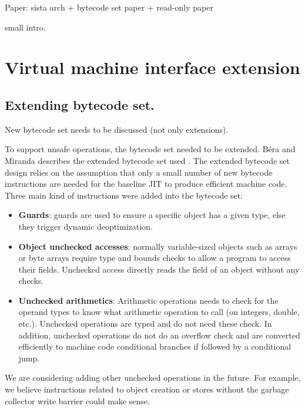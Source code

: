 \documentclass[a4paper,12pt,twoside]{../includes/ThesisStyle}
\begin{document}

Paper: sista arch + bytecode set paper + read-only paper

small intro. 

\section{Virtual machine interface extension}

\subsection{Extending bytecode set.}

New bytecode set needs to be discussed (not only extensions).

To support unsafe operations, the bytecode set needed to be extended. B\'era and Miranda describes the extended bytecode set used \cite{Bera14a}. The extended bytecode set design relies on the assumption that only a small number of new bytecode instructions are needed for the baseline JIT to produce efficient machine code. Three main kind of instructions were added into the bytecode set:
\begin{itemize}
\item \textbf{Guards}: guards are used to ensure a specific object has a given type, else they trigger dynamic deoptimization.
\item \textbf{Object unchecked accesses}: normally variable-sized objects such as arrays or byte arrays require type and bounds checks to allow a program to access their fields. Unchecked access directly reads the field of an object without any checks.
\item \textbf{Unchecked arithmetics}: Arithmetic operations needs to check for the operand types to know what arithmetic operation to call (on integers, double, etc.). Unchecked operations are typed and do not need these check. In addition, unchecked operations do not do an overflow check and are converted efficiently to machine code conditional branches if followed by a conditional jump.
\end{itemize}

We are considering adding other unchecked operations in the future. For example, we believe instructions related to object creation or stores without the garbage collector write barrier could make sense.
\end{document}
